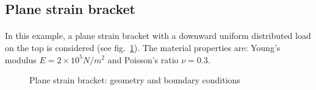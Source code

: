 \subsection{Plane strain bracket}
\paragraph{}
In this example, a plane strain bracket with a downward uniform distributed load on the top is considered (see fig.~\ref{qdt_fig:ex_bracket_geo_bc}).
The material properties are: Young’s modulus $E = 2\times 10^5 N/m^2$ and Poisson’s ratio $\nu = 0.3$.
    \begin{figure}[H]
        \centering
        \begin{subfigure}[b]{1\linewidth}
            \centering
        \end{subfigure}
        \begin{subfigure}[b]{1\linewidth}
            \centering
        \end{subfigure}
        \caption{ Plane strain bracket: geometry and boundary conditions}
        \label{qdt_fig:ex_bracket_geo_bc}
    \end{figure}

